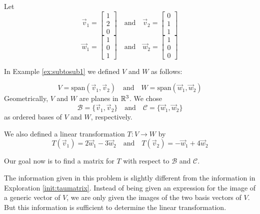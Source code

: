 \documentclass{ximera}
\begin{document}
\begin{exploration}\label{init:matlintransgeneral}
Let
$$\vec{v}_1=\begin{bmatrix}1\\2\\0\end{bmatrix}\quad\text{and}\quad\vec{v}_2=\begin{bmatrix}0\\1\\1\end{bmatrix}$$
$$\vec{w}_1=\begin{bmatrix}1\\0\\1\end{bmatrix}\quad\text{and}\quad\vec{w}_2=\begin{bmatrix}1\\0\\0\end{bmatrix}$$

In Example \ref{ex:subtosub1} we defined $V$ and $W$ as follows:

$$V=\text{span}(\vec{v}_1, \vec{v}_2)\quad\text{and}\quad W=\text{span}(\vec{w}_1, \vec{w}_2)$$
Geometrically, $V$ and $W$ are planes in $\mathbb{R}^3$.
We chose
$$\mathcal{B}=\{\vec{v}_1, \vec{v}_2\}\quad\text{and}\quad\mathcal{C}=\{\vec{w}_1, \vec{w}_2\}$$
as ordered bases of $V$ and $W$, respectively.

We also defined a linear transformation $T:V\rightarrow W$ by 
$$T(\vec{v}_1)=2\vec{w}_1-3\vec{w}_2\quad\text{and} \quad T(\vec{v}_2)=-\vec{w}_1+4\vec{w}_2$$

Our goal now is to find a matrix for $T$ with respect to $\mathcal{B}$ and $\mathcal{C}$.  

The information given in this problem is slightly different from the information in Exploration \ref{init:taumatrix}.  Instead of being given an expression for the image of a generic vector of $V$, we are only given the images of the two basis vectors of $V$.  But this information is sufficient to determine the linear transformation.


\end{exploration}
\end{document}
